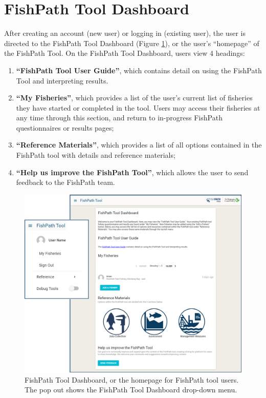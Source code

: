 \documentclass[11pt,]{book}
\providecommand{\tightlist}{%
  \setlength{\itemsep}{0pt}\setlength{\parskip}{0pt}}
\begin{document}
\hypertarget{fishpath-tool-dashboard}{%
\section{FishPath Tool Dashboard}\label{fishpath-tool-dashboard}}

After creating an account (new user) or logging in (existing user), the user is directed to the FishPath Tool Dashboard (Figure \ref{fig:dashboard}), or the user's ``homepage'' of the FishPath Tool. On the FishPath Tool Dashboard, users view 4 headings:

\begin{enumerate}
\def\labelenumi{\arabic{enumi}.}
\tightlist
\item
  \textbf{``FishPath Tool User Guide''}, which contains detail on using the FishPath Tool and interpreting results.
\item
  \textbf{``My Fisheries''}, which provides a list of the user's current list of fisheries they have started or completed in the tool. Users may access their fisheries at any time through this section, and return to in-progress FishPath questionnaires or results pages;
\item
  \textbf{``Reference Materials''}, which provides a list of all options contained in the FishPath tool with details and reference materials;
\item
  \textbf{``Help us improve the FishPath Tool''}, which allows the user to send feedback to the FishPath team.
\end{enumerate}

\begin{figure}

{\centering \includegraphics[width=0.95\linewidth]{images/user-dashboard} 

}

\caption{FishPath Tool Dashboard, or the homepage for FishPath tool users. The pop out shows the FishPath Tool Dashboard drop-down menu.}\label{fig:dashboard}
\end{figure}
\end{document}
